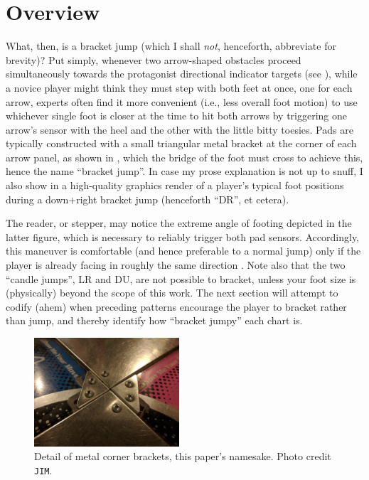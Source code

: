 \documentclass[10pt]{sigplanconf}
\begin{document}
\section{Overview}


What, then, is a bracket jump (which I shall \textit{not}, henceforth, abbreviate for brevity)?
Put simply, whenever two arrow-shaped obstacles proceed simultaneously towards the protagonist directional indicator targets
(see \cite{turniness}),
while a novice player might think they must step with both feet at once, one for each arrow,
experts often find it more convenient (i.e., less overall foot motion) to use whichever single foot is closer at the time
to hit both arrows by
triggering one arrow's sensor with the heel and the other with the little bitty toesies.
Pads are typically constructed with a small triangular metal bracket at the corner of each arrow panel,
as shown in ,
which the bridge of the foot must cross to achieve this, hence the name ``bracket jump''.
In case my prose explanation is not up to snuff, I also show in 
a high-quality graphics render of a player's typical foot positions during a down+right bracket jump (henceforth ``DR'', et cetera).

The reader, or stepper,
may notice the extreme angle of footing depicted in the latter figure,
which is necessary to reliably trigger both pad sensors.
Accordingly, this maneuver is comfortable (and hence preferable to a normal jump)
only if the player is already facing in roughly the same direction \cite{turniness}.
Note also that the two ``candle jumps'', LR and DU, are not possible to bracket,
unless your foot size is (physically) beyond the scope of this work.
The next section will attempt to codify (ahem) when
preceding patterns encourage the player to bracket rather than jump,
and thereby identify how ``bracket jumpy'' each chart is.

\begin{figure}[t]
	\begin{center}
		\includegraphics[width=0.48\textwidth]{jims-pix.jpg}
	\end{center}
	\caption{Detail of metal corner brackets, this paper's namesake. Photo credit {\tt JIM}.}
	\label{fig:bracker-detail}
\end{figure}
\end{document}
